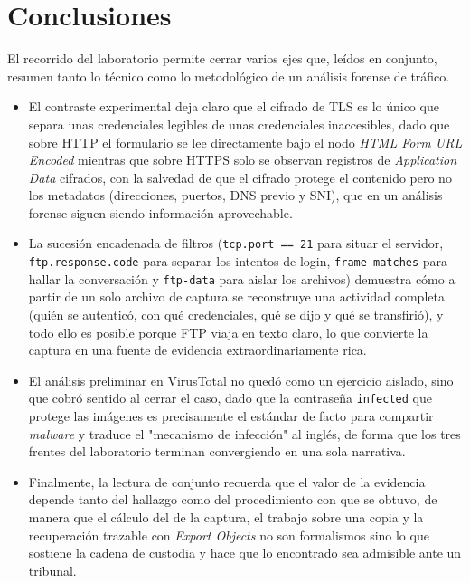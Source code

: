 \section*{Conclusiones}

El recorrido del laboratorio permite cerrar varios ejes que, leídos en conjunto, resumen tanto lo técnico como lo metodológico de un análisis forense de tráfico.

\begin{itemize}
  \item {} El contraste experimental deja claro que el cifrado de TLS es lo único que separa unas credenciales legibles de unas credenciales inaccesibles, dado que sobre HTTP el formulario se lee directamente bajo el nodo \emph{HTML Form URL Encoded} mientras que sobre HTTPS solo se observan registros de \emph{Application Data} cifrados, con la salvedad de que el cifrado protege el contenido pero no los metadatos (direcciones, puertos, DNS previo y SNI), que en un análisis forense siguen siendo información aprovechable.
  \item {} La sucesión encadenada de filtros (\texttt{tcp.port == 21} para situar el servidor, \texttt{ftp.response.code} para separar los intentos de login, \texttt{frame matches} para hallar la conversación y \texttt{ftp-data} para aislar los archivos) demuestra cómo a partir de un solo archivo de captura se reconstruye una actividad completa (quién se autenticó, con qué credenciales, qué se dijo y qué se transfirió), y todo ello es posible porque FTP viaja en texto claro, lo que convierte la captura en una fuente de evidencia extraordinariamente rica.
  \item {} El análisis preliminar en VirusTotal no quedó como un ejercicio aislado, sino que cobró sentido al cerrar el caso, dado que la contraseña \texttt{infected} que protege las imágenes es precisamente el estándar de facto para compartir \emph{malware} y traduce el "mecanismo de infección" al inglés, de forma que los tres frentes del laboratorio terminan convergiendo en una sola narrativa.
  \item {} Finalmente, la lectura de conjunto recuerda que el valor de la evidencia depende tanto del hallazgo como del procedimiento con que se obtuvo, de manera que el cálculo del  de la captura, el trabajo sobre una copia y la recuperación trazable con \emph{Export Objects} no son formalismos sino lo que sostiene la cadena de custodia y hace que lo encontrado sea admisible ante un tribunal.
\end{itemize}
